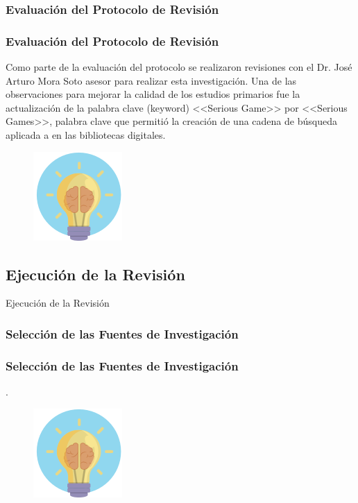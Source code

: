 \documentclass{beamer}
\begin{document}
\subsubsection{Evaluación del Protocolo de Revisión}
\begin{frame}
    \frametitle{Evaluación del Protocolo de Revisión}
    Como parte de la evaluación del protocolo se realizaron revisiones con el Dr. José Arturo Mora Soto asesor para realizar esta investigación. Una de las observaciones para mejorar la calidad de los estudios primarios fue la actualización de la palabra clave (keyword) <<Serious Game>> por <<Serious Games>>, palabra clave que permitió la creación de una cadena de búsqueda aplicada a en las bibliotecas digitales.
	\begin{figure}
		\begin{center}
			\includegraphics[scale=0.45]{images/2icons/need.png}
			\label{student}
		\end{center}
	\end{figure}
\end{frame}

\subsection{Ejecución de la Revisión} %
\begin{frame}
\Huge{\centerline{Ejecución de la Revisión}}
\end{frame}

\subsubsection{Selección de las Fuentes de Investigación} %
\begin{frame}
    \frametitle{Selección de las Fuentes de Investigación}
    .
	\begin{figure}
		\begin{center}
			\includegraphics[scale=0.45]{images/2icons/need.png}
			\label{student}
		\end{center}
	\end{figure}
\end{frame}
\end{document}
